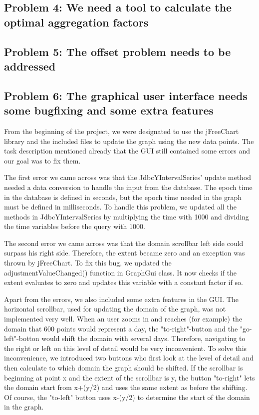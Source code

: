 \subsection{Problem 4: We need a tool to calculate the optimal aggregation factors}
\subsection{Problem 5: The offset problem needs to be addressed}
\subsection{Problem 6: The graphical user interface needs some bugfixing and some extra features}
From the beginning of the project, we were designated to use the jFreeChart library and the included files to update the graph using the new data points. The task description mentioned already that the GUI still contained some errors and our goal was to fix them.

The first error we came across was that the JdbcYIntervalSeries' update method needed a data conversion to handle the input from the database. The epoch time in the database is defined in seconds, but the epoch time needed in the graph must be defined in milliseconds. To handle this problem, we updated all the methods in JdbcYIntervalSeries by multiplying the time with 1000 and dividing the time variables before the query with 1000.

The second error we came across was that the domain scrollbar left side could surpass his right side. Therefore, the extent became zero and an exception was thrown by jFreeChart. To fix this bug, we updated the adjustmentValueChanged() function in GraphGui class. It now checks if the extent evaluates to zero and updates this variable with a constant factor if so.

Apart from the errors, we also included some extra features in the GUI. The horizontal scrollbar, used for updating the domain of the graph, was not implemented very well. When an user zooms in and reaches (for example) the domain that 600 points would represent a day, the "to-right"-button and the "go-left"-botton would shift the domain with several days. Therefore, navigating to the right or left on this level of detail would be very inconvenient.
To solve this inconvenience, we introduced two buttons who first look at the level of detail and then calculate to which domain the graph should be shifted. If the scrollbar is beginning at point x and the extent of the scrollbar is y, the button "to-right" lets the domain start from x+(y/2) and uses the same extent as before the shifting. Of course, the "to-left" button uses x-(y/2) to determine the start of the domain in the graph.